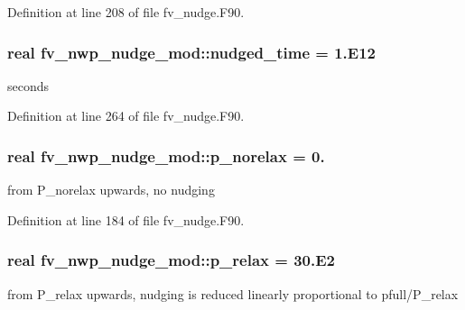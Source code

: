 Definition at line 208 of file fv\-\_\-nudge.\-F90.

\subsubsection[{nudged\-\_\-time}]{\setlength{\rightskip}{0pt plus 5cm}real fv\-\_\-nwp\-\_\-nudge\-\_\-mod\-::nudged\-\_\-time = 1.E12\hspace{0.3cm}{\ttfamily [private]}}\label{classfv__nwp__nudge__mod_a25110c10c670ba1da3b3897a09b2098e}


seconds 



Definition at line 264 of file fv\-\_\-nudge.\-F90.

\subsubsection[{p\-\_\-norelax}]{\setlength{\rightskip}{0pt plus 5cm}real fv\-\_\-nwp\-\_\-nudge\-\_\-mod\-::p\-\_\-norelax = 0.\hspace{0.3cm}{\ttfamily [private]}}\label{classfv__nwp__nudge__mod_af6821904d98d5a2b0c18d7f01061693b}


from P\-\_\-norelax upwards, no nudging 



Definition at line 184 of file fv\-\_\-nudge.\-F90.

\subsubsection[{p\-\_\-relax}]{\setlength{\rightskip}{0pt plus 5cm}real fv\-\_\-nwp\-\_\-nudge\-\_\-mod\-::p\-\_\-relax = 30.E2\hspace{0.3cm}{\ttfamily [private]}}\label{classfv__nwp__nudge__mod_a67d18a2de5bc8c716affd9b18e65de34}


from P\-\_\-relax upwards, nudging is reduced linearly proportional to pfull/\-P\-\_\-relax 



